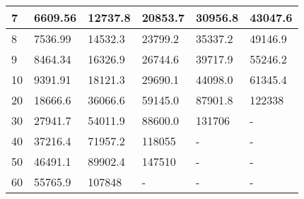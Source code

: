 \begin{table}[h]
\begin{tabular}{|l|l|l|l|l|l|}
7                                                                          & 6609.56                              & 12737.8                               & 20853.7                               & 30956.8                               & 43047.6                               \\ \hline
8                                                                          & 7536.99                              & 14532.3                               & 23799.2                               & 35337.2                               & 49146.9                               \\ \hline
9                                                                          & 8464.34                              & 16326.9                               & 26744.6                               & 39717.9                               & 55246.2                               \\ \hline
10                                                                         & 9391.91                              & 18121.3                               & 29690.1                               & 44098.0                               & 61345.4                               \\ \hline
20                                                                         & 18666.6                              & 36066.6                               & 59145.0                               & 87901.8                               & 122338                                \\ \hline
30                                                                         & 27941.7                              & 54011.9                               & 88600.0                               & 131706                                & -                                     \\ \hline
40                                                                         & 37216.4                              & 71957.2                               & 118055                                & -                                     & -                                     \\ \hline
50                                                                         & 46491.1                              & 89902.4                               & 147510                                & -                                     & -                                     \\ \hline
60                                                                         & 55765.9                              & 107848                                & -                                     & -                                     & -                                     \\ \hline

\end{tabular}
\end{table}
